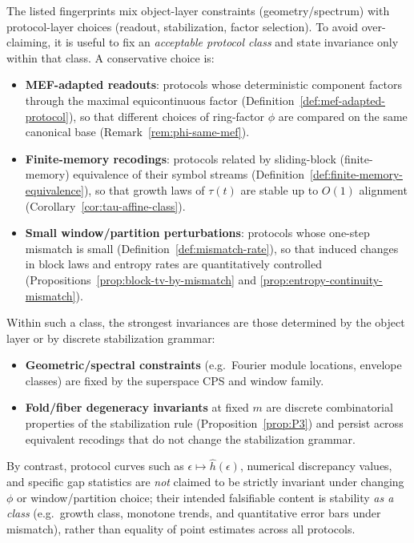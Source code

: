 \begin{remark}\label{rem:fingerprint-protocol-invariance}
The listed fingerprints mix object-layer constraints (geometry/spectrum) with protocol-layer choices (readout, stabilization, factor selection).
To avoid over-claiming, it is useful to fix an \emph{acceptable protocol class} and state invariance only within that class.
A conservative choice is:
\begin{itemize}[leftmargin=*,itemsep=2pt]
  \item \textbf{MEF-adapted readouts}: protocols whose deterministic component factors through the maximal equicontinuous factor (Definition~\ref{def:mef-adapted-protocol}), so that different choices of ring-factor $\phi$ are compared on the same canonical base (Remark~\ref{rem:phi-same-mef}).
  \item \textbf{Finite-memory recodings}: protocols related by sliding-block (finite-memory) equivalence of their symbol streams (Definition~\ref{def:finite-memory-equivalence}), so that growth laws of $\tau(t)$ are stable up to $O(1)$ alignment (Corollary~\ref{cor:tau-affine-class}).
  \item \textbf{Small window/partition perturbations}: protocols whose one-step mismatch is small (Definition~\ref{def:mismatch-rate}), so that induced changes in block laws and entropy rates are quantitatively controlled (Propositions~\ref{prop:block-tv-by-mismatch} and \ref{prop:entropy-continuity-mismatch}).
\end{itemize}
Within such a class, the strongest invariances are those determined by the object layer or by discrete stabilization grammar:
\begin{itemize}[leftmargin=*,itemsep=2pt]
  \item \textbf{Geometric/spectral constraints} (e.g.\ Fourier module locations, envelope classes) are fixed by the superspace CPS and window family.
  \item \textbf{Fold/fiber degeneracy invariants} at fixed $m$ are discrete combinatorial properties of the stabilization rule (Proposition~\ref{prop:P3}) and persist across equivalent recodings that do not change the stabilization grammar.
\end{itemize}
By contrast, protocol curves such as $\epsilon\mapsto \widehat h(\epsilon)$, numerical discrepancy values, and specific gap statistics are \emph{not} claimed to be strictly invariant under changing $\phi$ or window/partition choice; their intended falsifiable content is stability \emph{as a class} (e.g.\ growth class, monotone trends, and quantitative error bars under mismatch), rather than equality of point estimates across all protocols.
\end{remark}

